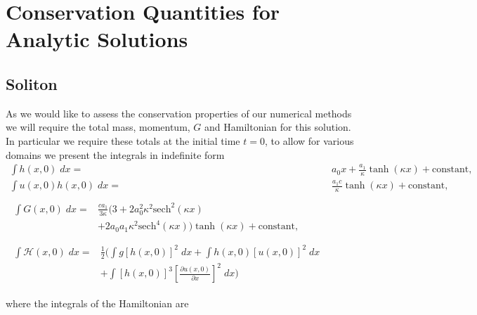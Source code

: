 \chapter{Conservation Quantities for Analytic Solutions}
\label{app:ConQuant}

\section{Soliton}

As we would like to assess the conservation properties of our numerical methods we will require the total mass, momentum, $G$ and Hamiltonian for this solution. In particular we require these totals at the initial time $t=0$, to allow for various domains we present the integrals in indefinite form 
\begin{subequations}
	\begin{align}
	\int h(x,0) \; dx = {} & a_0 x + \frac{a_1}{\kappa} \tanh\left(\kappa x\right) + \text{constant}, \\
	\int u(x,0)h(x,0) \;  dx = {} & \frac{a_1 c}{\kappa} \tanh\left(\kappa x\right)+ \text{constant}, \\  \nonumber \\
	\begin{split}
	\int G(x,0) \; dx = {}&  \frac{c a_1}{3 \kappa}  \Bigg(3 + 2a_0^2 \kappa^2\text{sech}^2\left(\kappa x\right)  \\ &+ 2a_0 a_1 \kappa^2 \text{sech}^4\left(\kappa x\right) \Bigg)\tanh\left(\kappa x\right)  + \text{constant} ,
	\end{split}
	\\  \nonumber \\
	\begin{split}
	\int \mathcal{H}(x,0) \; dx = {}&\frac{1}{2} \Bigg(\int g\left[h(x,0)\right]^2 \; dx + \int h(x,0)\left[u(x,0)\right]^2 \; dx  \\ &+ \int \left[h(x,0)\right]^3 \left[\frac{\partial u(x,0)}{\partial x}\right]^2 \; dx \Bigg) 
	\end{split}
	\end{align}
	\label{eqn:SolitonConservation}
\end{subequations}

where the integrals of the Hamiltonian are

